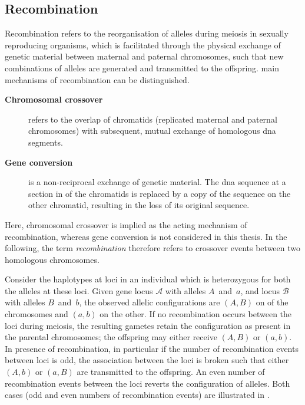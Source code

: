 %
\subsection{Recombination}
\label{sec:recombination}
%

Recombination refers to the reorganisation of alleles during meiosis in sexually reproducing organisms, which is facilitated through the physical exchange of genetic material between maternal and paternal chromosomes, such that new combinations of alleles are generated and transmitted to the offspring.
 main mechanisms of recombination can be distinguished.
\begin{description}
	\item[\textbf{Chromosomal crossover}] refers to the overlap of  chromatids (replicated maternal and paternal chromosomes) with subsequent, mutual exchange of homologous \gls{dna} segments.
	\item[\textbf{Gene conversion}] is a non-reciprocal exchange of genetic material.
	The \gls{dna} sequence at a section in  of the chromatids is replaced by a copy of the sequence on the other chromatid, resulting in the loss of its original sequence.
\end{description}
Here, chromosomal crossover is implied as the acting mechanism of recombination, whereas gene conversion is not considered in this thesis.
In the following, the term \emph{recombination} therefore refers to crossover events between two homologous chromosomes.

%

%

Consider the haplotypes at  loci in an individual which is heterozygous for both the alleles at these loci.
Given gene locus $\mathcal{A}$ with alleles $A$~and~$a$, and locus $\mathcal{B}$ with alleles $B$~and~$b$, the observed allelic configurations are $(A,B)$ on  of the chromosomes and $(a,b)$ on the other.
If no recombination occurs between the  loci during meiosis, the resulting gametes retain the configuration as present in the parental chromosomes; \ie the offspring may either receive $(A,B)$ or $(a,b)$.
In presence of recombination, in particular if the number of recombination events between loci is odd, the association between the  loci is broken such that either $(A,b)$ or $(a,B)$ are transmitted to the offspring.
An even number of recombination events between the  loci reverts the configuration of alleles.
Both cases (odd and even numbers of recombination events) are illustrated in .


